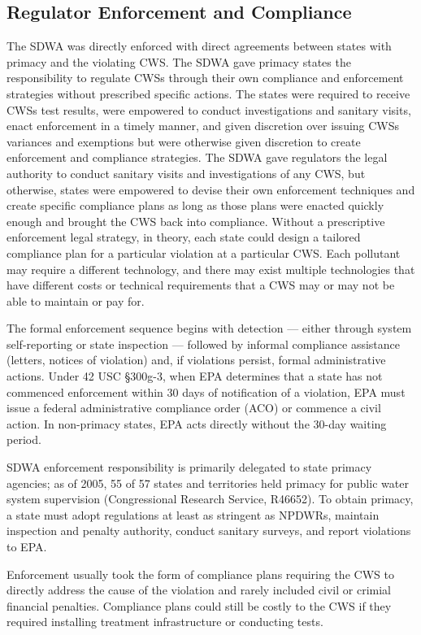 \documentclass{article}
\begin{document}
\subsection{Regulator Enforcement and Compliance}

The SDWA was directly enforced with direct agreements between states with primacy and the violating CWS. The SDWA gave primacy states the responsibility to regulate CWSs through their own compliance and enforcement strategies without prescribed specific actions. The states were required to receive CWSs test results, were empowered to conduct investigations and sanitary visits, enact enforcement in a timely manner, and given discretion over issuing CWSs variances and exemptions but were otherwise given discretion to create enforcement and compliance strategies. The SDWA gave regulators the legal authority to conduct sanitary visits and investigations of any CWS, but otherwise, states were empowered to devise their own enforcement techniques and create specific compliance plans as long as those plans were enacted quickly enough and brought the CWS back into compliance. Without a prescriptive enforcement legal strategy, in theory, each state could design a tailored compliance plan for a particular violation at a particular CWS. Each pollutant may require a different technology, and there may exist multiple technologies that have different costs or technical requirements that a CWS may or may not be able to maintain or pay for. 

The formal enforcement sequence begins with detection — either through system self-reporting or state inspection — followed by informal compliance assistance (letters, notices of violation) and, if violations persist, formal administrative actions. Under 42 USC §300g-3, when EPA determines that a state has not commenced enforcement within 30 days of notification of a violation, EPA must issue a federal administrative compliance order (ACO) or commence a civil action. In non-primacy states, EPA acts directly without the 30-day waiting period.

SDWA enforcement responsibility is primarily delegated to state primacy agencies; as of 2005, 55 of 57 states and territories held primacy for public water system supervision (Congressional Research Service, R46652). To obtain primacy, a state must adopt regulations at least as stringent as NPDWRs, maintain inspection and penalty authority, conduct sanitary surveys, and report violations to EPA.

Enforcement usually took the form of compliance plans requiring the CWS to directly address the cause of the violation and rarely included civil or crimial financial penalties. Compliance plans could still be costly to the CWS if they required installing treatment infrastructure or conducting tests. 
\end{document}
